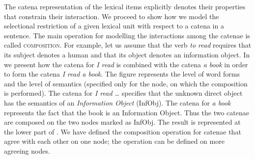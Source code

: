\documentclass[output=paper]{langsci/langscibook}
\begin{document}
The catena representation of the lexical items explicitly denotes their
properties that constrain their interaction. We proceed to show how we model
the selectional restriction of a given lexical unit with respect to a catena
in a sentence. The main operation for modelling the interactions among the
catenae is called  \textsc{composition}. For example, let us assume that the
verb \textit{to read} requires that its subject denotes a human and that its object
denotes an information object. In  we present how
the catena for \textit{I read} is combined with the catena \textit{a book} in order to
form the catena \textit{I read a book}. The figure represents the level of word
forms and the level of semantics (specified only for the node, on which the
composition is performed). The catena for \textit{I read \ldots} specifies that the
unknown direct object has the semantics of an {\em Information Object}
(InfObj). The catena for \textit{a book} represents the fact that the book is an
Information Object. Thus the two catenae are composed on the two nodes
marked as InfObj. The result is represented at the lower part of . We have
defined the composition operation for catenae that agree with each other on
one node; the operation can be defined on more agreeing nodes.
\end{document}
